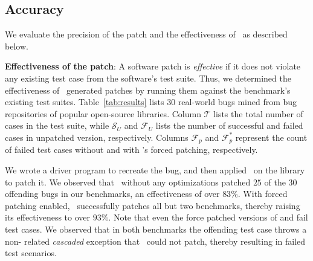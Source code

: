 \subsection{Accuracy}
\label{sub:accuracy}

We evaluate the precision of the patch and the effectiveness of \tool\ as
described below.

\begin{mylist}

\item \textbf{Effectiveness of the patch}: A software patch is \emph{effective}
if it does not violate any existing test case from the software's test suite.
Thus, we determined the effectiveness of \tool\ generated patches by running
them against the benchmark's existing test suites. Table~\ref{tab:results} lists
$30$ real-world bugs mined from bug repositories of popular open-source
libraries. Column $\mathcal{T}$ lists the total number of cases in the test
suite, while $\mathcal{S}_{U}$ and $\mathcal{F}_{U}$ lists the number of
successful and failed cases in unpatched version, respectively. Columns
$\mathcal{F}_{p}$ and $\mathcal{F}_{p}^{*}$ represent the count of failed test
cases without and with \tool{}'s forced patching,
respectively.

We wrote a driver program to recreate the bug, and then applied \tool\ on the
library to patch it. We observed that \tool\ without any optimizations patched
$25$ of the $30$ offending bugs in our benchmarks, an effectiveness of over
$83\%$. With forced patching enabled,
\tool\ successfully patches all but two benchmarks, thereby raising its
effectiveness to over $93\%$. Note that even the force patched versions of
 and  fail test cases. We observed
that in both benchmarks the offending test case throws a non-
related \textit{cascaded} exception that \tool\ could not patch, thereby
resulting in failed test scenarios.


\end{mylist}
